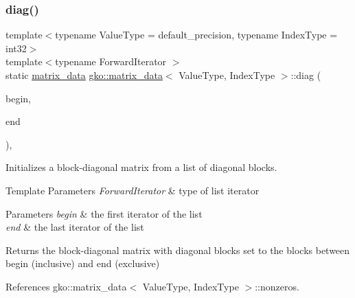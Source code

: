 \subsubsection{\texorpdfstring{diag()}{diag()}\hspace{0.1cm}{\footnotesize\ttfamily [4/5]}}
{\footnotesize\ttfamily template$<$typename Value\+Type = default\+\_\+precision, typename Index\+Type = int32$>$ \\
template$<$typename Forward\+Iterator $>$ \\
static \hyperlink{structgko_1_1matrix__data}{matrix\+\_\+data} \hyperlink{structgko_1_1matrix__data}{gko\+::matrix\+\_\+data}$<$ Value\+Type, Index\+Type $>$\+::diag (\begin{DoxyParamCaption}\item[{Forward\+Iterator}]{begin,  }\item[{Forward\+Iterator}]{end }\end{DoxyParamCaption})\hspace{0.3cm}{\ttfamily [inline]}, {\ttfamily [static]}}



Initializes a block-\/diagonal matrix from a list of diagonal blocks. 


\begin{DoxyTemplParams}{Template Parameters}
{\em Forward\+Iterator} & type of list iterator\\
\hline
\end{DoxyTemplParams}

\begin{DoxyParams}{Parameters}
{\em begin} & the first iterator of the list \\
\hline
{\em end} & the last iterator of the list\\
\hline
\end{DoxyParams}
\begin{DoxyReturn}{Returns}
the block-\/diagonal matrix with diagonal blocks set to the blocks between begin (inclusive) and end (exclusive) 
\end{DoxyReturn}


References gko\+::matrix\+\_\+data$<$ Value\+Type, Index\+Type $>$\+::nonzeros.

\mbox{\label{structgko_1_1matrix__data_aa809c5fbd147b72b18efeca595338398}} 

